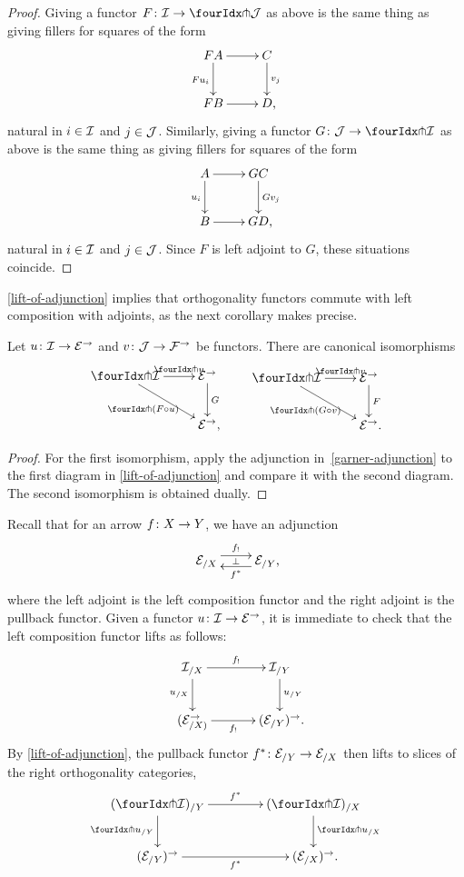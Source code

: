 \documentclass[reqno,10pt,a4paper,oneside]{amsart}
\begin{document}
\begin{proof}
Giving a functor $F \co \cal{I} \to \liftl{\cal{J}}$ as above is the same thing as giving fillers for squares of the form
\[
\xymatrix{
  FA \ar[d]_{F u_i} \ar[r] & C \ar[d]^{v_j} \\
  FB \ar[r] & D \rlap{,}
}
\]
natural in $i \in \cal{I}$ and $j \in \cal{J}$.
Similarly, giving a functor $G \co \cal{J} \to \liftl{\cal{I}}$ as above is the same thing as giving fillers for squares of the form
\[
\xymatrix{
  A \ar[d]_{u_i} \ar[r] & GC \ar[d]^{Gv_j} \\
  B \ar[r] & GD \rlap{,}
}
\]
natural in $i \in \cal{I}$ and $j \in \cal{J}$.
Since $F$ is left adjoint to $G$, these situations coincide.
\end{proof}

\cref{lift-of-adjunction} implies that orthogonality functors commute with left composition with adjoints, as the next corollary makes precise.


\begin{corollary} \label{pitchfork-adjunction}
Let $u \co \cal{I} \to \cal{E}^\to$ and $v \co \cal{J} \to \cal{F}^\to$ be functors.
There are canonical isomorphisms
\begin{align*}
\xycenter{
\liftr{\cal{I}} \ar[dr]_-{\liftr{(F \cc u)}}  \ar[r]^-{\liftr{u}} & \cal{E}^\to \ar[d]^-G \\
& \cal{E}^\to \rlap{,} }  \qquad
\xycenter{
 \liftl{\cal{I}}  \ar[r]^-{\liftl{v}} \ar[dr]_-{\liftl{(G \cc v)}}  & \cal{E}^\to \ar[d]^-{F}   \\
& \cal{E}^\to \rlap{.}  }
\end{align*}
\end{corollary}

\begin{proof}
For the first isomorphism, apply the adjunction in~\eqref{garner-adjunction} to the first diagram in \cref{lift-of-adjunction} and compare it with the second diagram.
The second isomorphism is obtained dually.
\end{proof}


\begin{example} \label{exa:composition-pullback-lift}
Recall that for an arrow $f \co X \to Y$, we have an adjunction
\[
\xymatrix{
\cal{E}_{/X} \ar@<1ex>[r]^{f_{!}} \ar@{}[r]|{\bot} & \cal{E}_{/Y} \rlap{,} \ar@<1ex>[l]^{f^*}}
\]
where the left adjoint is the left composition functor and the right adjoint is the pullback functor.
Given a functor $u \co \cal{I} \to \cal{E}^\to$, it is immediate to check that the left composition functor lifts as follows:
\[
\xymatrix@C+1em{
  \cal{I}_{/X}
  \ar[r]^-{f_!}
  \ar[d]_{u_{/X}}
&
  \cal{I}_{/Y}
  \ar[d]^{u_{/Y}}
\\
  (\calE_{/X)}^\to
  \ar[r]_-{f_!}
&
  (\calE_{/Y})^\to \rlap{.}
}
\]
By \cref{lift-of-adjunction}, the pullback functor $f^* \co \cal{E}_{/Y} \to \cal{E}_{/X}$ then lifts to slices of the right orthogonality categories,
\[
\xymatrix@C=1.5cm{
   (\liftr{\cal{I}})_{/ Y}
 \ar[d]_{{\liftr{u}}_{/Y}}
  \ar[r]^{f^*}
&
  (\liftr{\cal{I}})_{/X}
 \ar[d]^{{\liftr{u}}_{/X}}
\\
 ({\catE}_{/Y})^\to
  \ar[r]_{f^*}
&
   (\catE_{/X})^\to \rlap{.}
}
\]
\end{example}
\end{document}
